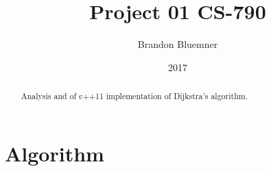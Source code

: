 \documentclass[12pt]{article}
\begin{document}
\title{Project 01 CS-790}
\author{Brandon Bluemner}
\date{2017}
\maketitle
\begin{abstract}
Analysis and of c++11 implementation of Dijkstra's algorithm. 

\end{abstract}
\section[Algorithm]{Algorithm}
\end{document}
